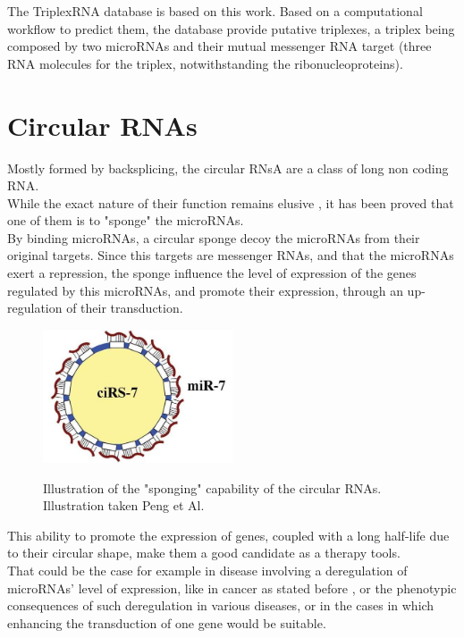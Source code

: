 \documentclass[a4paper,12pt]{report}
\begin{document}
The TriplexRNA database is based on this work. Based on a computational workflow to predict them\cite{triplex}, the database provide putative triplexes, a triplex being composed by two microRNAs and their mutual messenger RNA target (three RNA molecules for the triplex, notwithstanding the ribonucleoproteins). 

\section{Circular RNAs}

Mostly formed by backsplicing\cite{diversity, sponge}, the circular RNsA are a class of long non coding RNA.\\

While the exact nature of their function remains elusive \cite{diversity, mir7, sponge}, it has been proved that one of them is to "sponge" the microRNAs\cite{mir7,sponge}. \\

By binding microRNAs, a circular sponge decoy the microRNAs from their original targets. Since this targets are messenger RNAs, and that the microRNAs exert a repression, the sponge influence the level of expression of the genes regulated by this microRNAs, and promote their expression, through an up-regulation of their transduction\cite{mir7,carcinoma,sponge}.

\begin{figure}[H]
	\centering
	{\includegraphics[width=0.5\textwidth]{sponge.jpg}}
	\caption{Illustration of the "sponging" capability of the circular RNAs. Illustration taken Peng et Al\cite{sponge}.}
\end{figure}

This ability to promote the expression of genes, coupled with a long half-life due to their circular shape\cite{sponge}, make them a good candidate as a therapy tools.\\

That could be the case for example in disease involving a deregulation of microRNAs' level of expression, like in cancer as stated before \cite{cancer}, or the phenotypic consequences of such deregulation in various diseases\cite{therapeutics}, or in the cases in which enhancing the transduction of one gene would be suitable.\\
\end{document}
